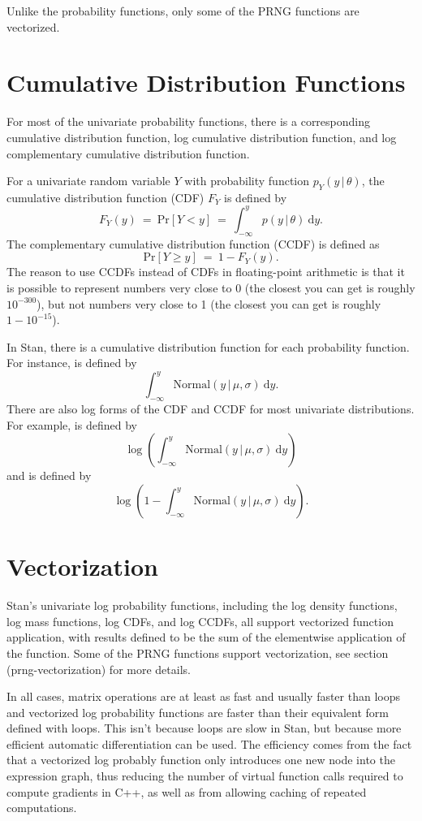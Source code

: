 \begin{description}
{\begin{description}
Unlike the probability functions, only some of the PRNG functions are vectorized.


\section{Cumulative Distribution Functions}


For most of the univariate probability functions, there is a corresponding cumulative distribution function, log cumulative distribution function, and log complementary cumulative distribution function.


For a univariate random variable $Y$ with probability function $p_Y(y \, | \, \theta)$, the cumulative distribution function (CDF) $F_Y$ is defined by \[ F_Y(y) \ = \ \text{Pr}[Y < y] \ = \ \int_{-\infty}^y p(y \, | \, \theta) \ \text{d}y. \] The complementary cumulative distribution function (CCDF) is defined as \[ \text{Pr}[Y \geq y] \ = \ 1 - F_Y(y). \] The reason to use CCDFs instead of CDFs in floating-point arithmetic is that it is possible to represent numbers very close to 0 (the closest you can get is roughly $10^{-300}$), but not numbers very close to 1 (the closest you can get is roughly $1 - 10^{-15}$).


In Stan, there is a cumulative distribution function for each probability function.  For instance,  is defined by \[ \int_{-\infty}^y \text{Normal}(y \, | \, \mu, \sigma) \ \text{d}y. \] There are also log forms of the CDF and CCDF for most univariate distributions.  For example,  is defined by \[ \log \left( \int_{-\infty}^y \text{Normal}(y \, | \, \mu, \sigma) \   \text{d}y \right) \] and  is defined by \[ \log \left( 1 - \int_{-\infty}^y \text{Normal}(y \, | \, \mu, \sigma) \   \text{d}y \right). \] 

\section{Vectorization}\label{vectorization.section}


Stan's univariate log probability functions, including the log density functions, log mass functions, log CDFs, and log CCDFs, all support vectorized function application, with results defined to be the sum of the elementwise application of the function.  Some of the PRNG functions support vectorization, see section \@ref(prng-vectorization) for more details.


In all cases, matrix operations are at least as fast and usually faster than loops and vectorized log probability functions are faster than their equivalent form defined with loops.  This isn't because loops are slow in Stan, but because more efficient automatic differentiation can be used.  The efficiency comes from the fact that a vectorized log probably function only introduces one new node into the expression graph, thus reducing the number of virtual function calls required to compute gradients in  C++, as well as from allowing caching of repeated computations.



\end{description}}
\end{description}
